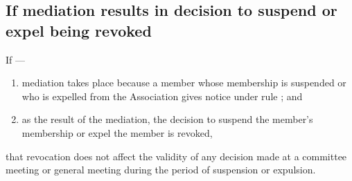 \documentclass[../constitution.tex]{subfiles}
\begin{document}

\hypertarget{if-mediation-results-in-decision-to-suspend-or-expel-being-revoked}{%
\subsection{If mediation results in decision to suspend or expel being revoked}\label{if-mediation-results-in-decision-to-suspend-or-expel-being-revoked}}

If ---

  \begin{enumerate}
  \def\labelenumi{\alph{enumi})}
  \setcounter{enumi}{0}
  \item mediation takes place because a member whose membership is suspended or who is expelled from the Association gives notice under rule \chreplaced[id=proofing]{\ref{expulsion-appoint-mediator}}{\ref{expulsion-written-notice}}; and
  \item as the result of the mediation, the decision to suspend the member's membership or expel the member is revoked,
  \end{enumerate}

that revocation does not affect the validity of any decision made at a committee meeting or general meeting during the period of suspension or expulsion.
\end{document}
